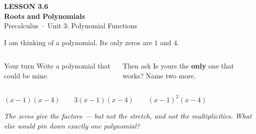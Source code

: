 \documentclass[aspectratio=169, 11pt]{beamer}
\begin{document}
{
\begin{frame}[plain]
  \vspace{2.8cm}\hspace{0.55cm}%
  \begin{minipage}{0.9\textwidth}
    {\color{goldacc}\bfseries\small LESSON 3.6}\\[0.5cm]
    {\color{white}\bfseries\LARGE Roots and Polynomials}\\[1.2cm]
    {\color{lilacmid}\small Precalculus~$\cdot$~Unit 3: Polynomial Functions}
  \end{minipage}
\end{frame}
}

\begin{frame}[t, plain]

  I am thinking of a polynomial. Its only zeros are \(1\) and \(4\).

  \bigskip
  \begin{columns}[T]
      \begin{block}{Your turn}
        Write a polynomial that could be mine.
      \end{block}

      \begin{block}{Then ask}
        Is yours the \textbf{only} one that works? Name two more.
      \end{block}
  \end{columns}

  \bigskip
  \begin{center}
    {\Large \((x - 1)(x - 4) \qquad 3(x - 1)(x - 4) \qquad (x - 1)^2(x - 4)\)}
  \end{center}

  \bigskip
  \textit{The zeros give the factors --- but not the stretch, and not the multiplicities. What
  else would pin down exactly one polynomial?}
\end{frame}
\end{document}
